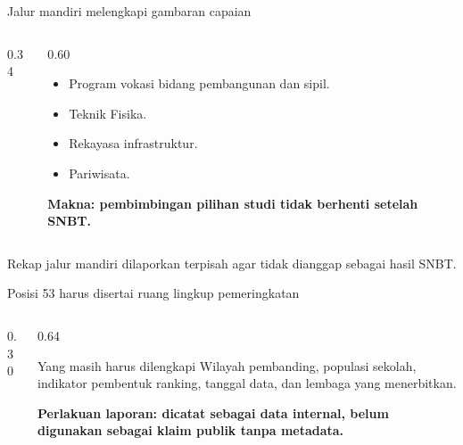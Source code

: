 \begin{frame}{Jalur mandiri melengkapi gambaran capaian}
  \begin{columns}[T,onlytextwidth]
    \begin{column}{0.34\textwidth}
    \end{column}
    \begin{column}{0.60\textwidth}
      \begin{itemize}
        \item Program vokasi bidang pembangunan dan sipil.
        \item Teknik Fisika.
        \item Rekayasa infrastruktur.
        \item Pariwisata.
      \end{itemize}
      \vspace{0.12cm}
      {\color{StudentBlue}\bfseries\fontsize{10.5}{13}\selectfont Makna: pembimbingan pilihan studi tidak berhenti setelah SNBT.}
    \end{column}
  \end{columns}
  \vspace{0.20cm}
  {\color{StudentGray}\fontsize{9.5}{11.8}\selectfont Rekap jalur mandiri dilaporkan terpisah agar tidak dianggap sebagai hasil SNBT.}
\end{frame}

\begin{frame}{Posisi 53 harus disertai ruang lingkup pemeringkatan}
  \begin{columns}[T,onlytextwidth]
    \begin{column}{0.30\textwidth}
    \end{column}
    \begin{column}{0.64\textwidth}
      \begin{block}{Yang masih harus dilengkapi}
        Wilayah pembanding, populasi sekolah, indikator pembentuk ranking, tanggal data, dan lembaga yang menerbitkan.
      \end{block}
      \vspace{0.12cm}
      {\color{StudentGold}\bfseries\fontsize{10.5}{13}\selectfont Perlakuan laporan: dicatat sebagai data internal, belum digunakan sebagai klaim publik tanpa metadata.}
    \end{column}
  \end{columns}
\end{frame}

